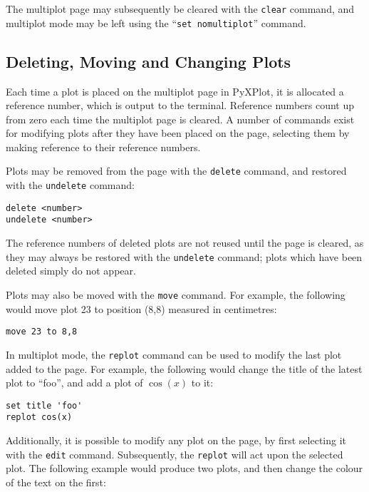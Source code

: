 The multiplot page may subsequently be cleared with the \texttt{clear} command,
and multiplot mode may be left using the ``\texttt{set nomultiplot}''
command.

\subsection{Deleting, Moving and Changing Plots}

Each time a plot is placed on the multiplot page in PyXPlot, it is allocated a
reference number, which is output to the terminal. Reference numbers count up
from zero each time the multiplot page is cleared. A number of commands exist
for modifying plots after they have been placed on the page, selecting them by
making reference to their reference numbers.

Plots may be removed from the page with the \texttt{delete} command, and
restored with the \texttt{undelete} command:

\begin{verbatim} 
delete <number>
undelete <number>
\end{verbatim}

The reference numbers of deleted plots are not reused until the page is
cleared, as they may always be restored with the \texttt{undelete} command;
plots which have been deleted simply do not appear.

Plots may also be moved with the \texttt{move} command. For example, the
following would move plot 23 to position (8,8) measured in centimetres:

\begin{verbatim} 
move 23 to 8,8
\end{verbatim}

In multiplot mode, the \texttt{replot} command can be used to modify the last
plot added to the page. For example, the following would change the title of
the latest plot to ``foo'', and add a plot of $\cos(x)$ to it:

\begin{verbatim} 
set title 'foo'
replot cos(x)
\end{verbatim}

Additionally, it is possible to modify any plot on the page, by first selecting
it with the \texttt{edit} command. Subsequently, the \texttt{replot} will act
upon the selected plot. The following example would produce two plots, and then
change the colour of the text on the first:

